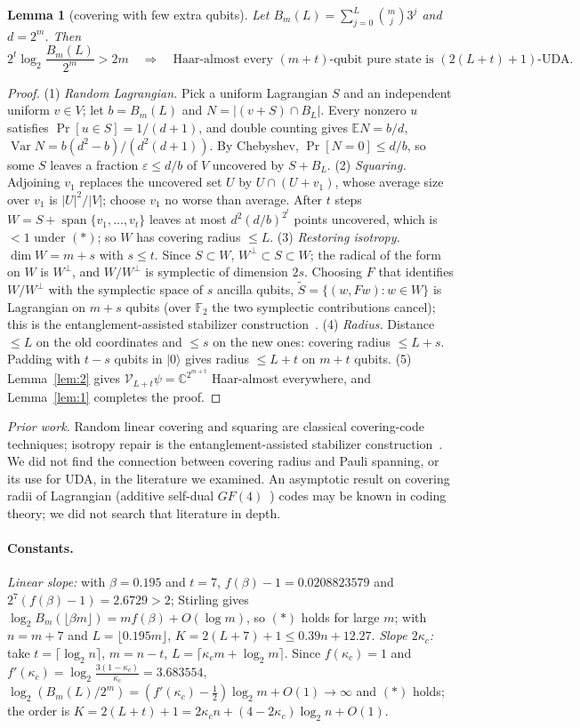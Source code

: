 \documentclass[aps,pra,onecolumn,superscriptaddress,nofootinbib,longbibliography,10pt]{revtex4-2}
\newtheorem{lemma}{Lemma}
\theoremstyle{definition}
\newcommand{\CC}{\mathbb C}
\newcommand{\FF}{\mathbb F}
\newcommand{\kc}{\kappa_c}
\begin{document}
\begin{lemma}[covering with few extra qubits]\label{lem:3}
Let $B_m(L)=\sum_{j=0}^{L}\binom mj3^j$ and $d=2^m$. Then
\[
2^t\log_2\frac{B_m(L)}{2^m}>2m\quad\Longrightarrow\quad\text{Haar-almost every $(m+t)$-qubit pure state is $(2(L+t)+1)$-UDA.}\tag{$*$}
\]
\end{lemma}
\begin{proof}
(1) \emph{Random Lagrangian.} Pick a uniform Lagrangian $S$ and an independent uniform $v\in V$; let $b=B_m(L)$ and $N=|(v+S)\cap B_L|$. Every nonzero $u$ satisfies $\Pr[u\in S]=1/(d+1)$, and double counting gives $\mathbb EN=b/d$, $\operatorname{Var}N=b(d^2-b)/(d^2(d+1))$. By Chebyshev, $\Pr[N=0]\le d/b$, so some $S$ leaves a fraction $\varepsilon\le d/b$ of $V$ uncovered by $S+B_L$.
(2) \emph{Squaring.} Adjoining $v_1$ replaces the uncovered set $U$ by $U\cap(U+v_1)$, whose average size over $v_1$ is $|U|^2/|V|$; choose $v_1$ no worse than average. After $t$ steps $W=S+\operatorname{span}\{v_1,\dots,v_t\}$ leaves at most $d^2(d/b)^{2^t}$ points uncovered, which is $<1$ under $(*)$; so $W$ has covering radius $\le L$.
(3) \emph{Restoring isotropy.} $\dim W=m+s$ with $s\le t$. Since $S\subset W$, $W^\perp\subset S\subset W$; the radical of the form on $W$ is $W^\perp$, and $W/W^\perp$ is symplectic of dimension $2s$. Choosing $F$ that identifies $W/W^\perp$ with the symplectic space of $s$ ancilla qubits, $\widetilde S=\{(w,Fw):w\in W\}$ is Lagrangian on $m+s$ qubits (over $\FF_2$ the two symplectic contributions cancel); this is the entanglement-assisted stabilizer construction~\cite{BDH06}.
(4) \emph{Radius.} Distance $\le L$ on the old coordinates and $\le s$ on the new ones: covering radius $\le L+s$. Padding with $t-s$ qubits in $|0\rangle$ gives radius $\le L+t$ on $m+t$ qubits.
(5) Lemma~\ref{lem:2} gives $\mathcal V_{L+t}\psi=\CC^{2^{m+t}}$ Haar-almost everywhere, and Lemma~\ref{lem:1} completes the proof.
\end{proof}
\noindent \emph{Prior work.} Random linear covering and squaring are classical covering-code techniques; isotropy repair is the entanglement-assisted stabilizer construction~\cite{BDH06}. We did not find the connection between covering radius and Pauli spanning, or its use for UDA, in the literature we examined. An asymptotic result on covering radii of Lagrangian (additive self-dual $GF(4)$~\cite{CRSS98}) codes may be known in coding theory; we did not search that literature in depth.

\paragraph*{Constants.} \emph{Linear slope:} with $\beta=0.195$ and $t=7$, $f(\beta)-1=0.0208823579$ and $2^7(f(\beta)-1)=2.6729>2$; Stirling gives $\log_2B_m(\lfloor\beta m\rfloor)=mf(\beta)+O(\log m)$, so $(*)$ holds for large $m$; with $n=m+7$ and $L=\lfloor0.195m\rfloor$, $K=2(L+7)+1\le0.39n+12.27$. \emph{Slope $2\kc$:} take $t=\lceil\log_2n\rceil$, $m=n-t$, $L=\lceil\kc m+\log_2m\rceil$. Since $f(\kc)=1$ and $f'(\kc)=\log_2\frac{3(1-\kc)}{\kc}=3.683554$, $\log_2(B_m(L)/2^m)=(f'(\kc)-\tfrac12)\log_2m+O(1)\to\infty$ and $(*)$ holds; the order is $K=2(L+t)+1=2\kc n+(4-2\kc)\log_2n+O(1)$.
\end{document}
